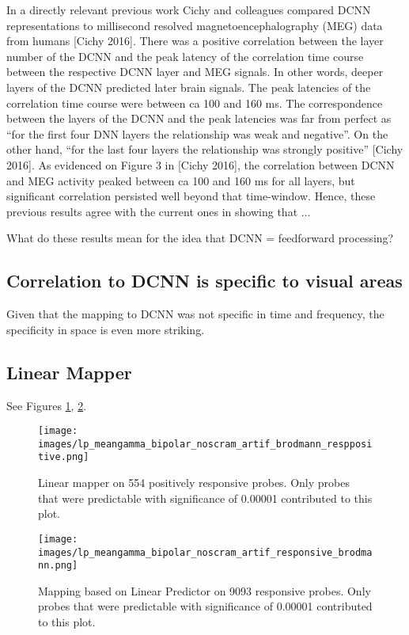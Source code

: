 \documentclass[final]{jneurosci}
\begin{document}
In a directly relevant previous work Cichy and colleagues compared DCNN representations to millisecond resolved magnetoencephalography (MEG) data from humans [Cichy 2016]. There was a positive correlation between the layer number of the DCNN and the peak latency of the correlation time course between the respective DCNN layer and MEG signals. In other words, deeper layers of the DCNN predicted later brain signals. The peak latencies of the correlation time course were between ca 100 and 160 ms. The correspondence between the layers of the DCNN and the peak latencies was far from perfect as “for the first four DNN layers the relationship was weak and negative”. On the other hand, “for the last four layers the relationship was strongly positive” [Cichy 2016]. As evidenced on Figure 3 in [Cichy 2016], the correlation between DCNN and MEG activity peaked between ca 100 and 160 ms for all layers, but significant correlation persisted well beyond that time-window. Hence, these previous results agree with the current ones in showing that  ...

What do these results mean for the idea that DCNN = feedforward processing?

\subsection{Correlation to DCNN is specific to visual areas}

Given that the mapping to DCNN was not specific in time and frequency, the specificity in space is even more striking.

%
%
\subsection{Linear Mapper}

See Figures \ref{fig:lp-resppositive}, \ref{fig:lp-responsive}.

\begin{figure}[h]
\centering
\texttt{[image: images/lp\_meangamma\_bipolar\_noscram\_artif\_brodmann\_resppositive.png]}
\caption{Linear mapper on 554 positively responsive probes. Only probes that were predictable with significance of 0.00001 contributed to this plot.}
\label{fig:lp-resppositive}
\end{figure}

\begin{figure}[h]
\centering
\texttt{[image: images/lp\_meangamma\_bipolar\_noscram\_artif\_responsive\_brodmann.png]}
\caption{Mapping based on Linear Predictor on 9093 responsive probes.  Only probes that were predictable with significance of 0.00001 contributed to this plot.}
\label{fig:lp-responsive}
\end{figure}
\end{document}
